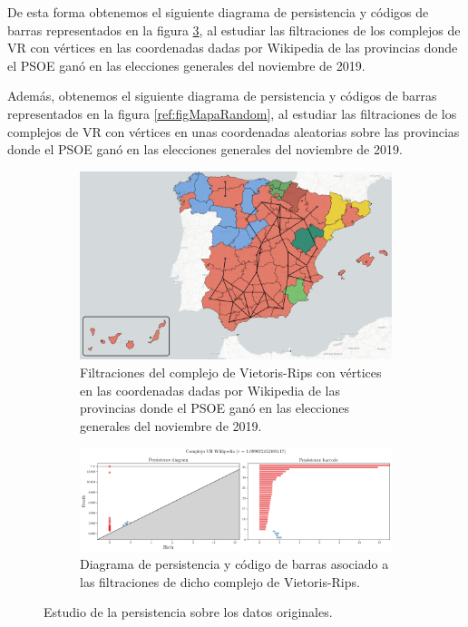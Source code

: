 De esta forma obtenemos el siguiente diagrama de persistencia y códigos de barras representados en la figura \ref{ref:figMapaWiki}, al estudiar las filtraciones de los complejos de VR con vértices en las coordenadas dadas por Wikipedia de las provincias donde el PSOE ganó en las elecciones generales del noviembre de 2019.

Además, obtenemos el siguiente diagrama de persistencia y códigos de barras representados en la figura \ref{ref:figMapaRandom}, al estudiar las filtraciones de los complejos de VR con vértices en unas coordenadas aleatorias sobre las provincias donde el PSOE ganó en las elecciones generales del noviembre de 2019.

\newpage
\vspace*{\fill}
\begin{figure}[!ht]
\centering
\begin{subfigure}[b]{\textwidth}
	\centering
	\includegraphics[width=\textwidth]{include/figuras/mapaWikipedia.png} 
	\caption{Filtraciones del complejo de Vietoris-Rips con vértices en las coordenadas dadas por Wikipedia de las provincias donde el PSOE ganó en las elecciones generales del noviembre de 2019.}
	\label{ref:mapaWiki}
\end{subfigure}
\begin{subfigure}[b]{\textwidth}
	\centering
	\includegraphics[width=\textwidth]{../code/output/ejemploMapa.png} 
	\caption{Diagrama de persistencia y código de barras asociado a las filtraciones de dicho complejo de Vietoris-Rips.}
	\label{ref:persMapaWiki}
\end{subfigure}
\caption{Estudio de la persistencia sobre los datos originales.}
\label{ref:figMapaWiki}
\end{figure} 
